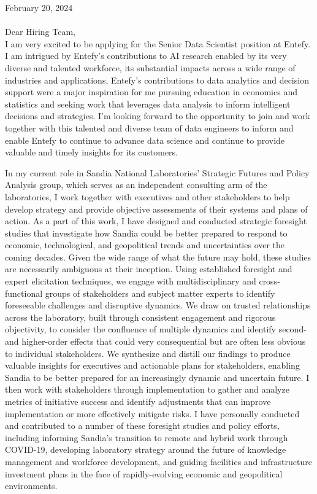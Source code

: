\documentclass[10pt]{article}
\begin{document}
	

\noindent February 20, 2024\\\\
\noindent Dear Hiring Team,\\

I am very excited to be applying for the Senior Data Scientist position at Entefy. I am intrigued by Entefy's contributions to AI research enabled by its very diverse and talented workforce, its substantial impacts across a wide range of industries and applications,  Entefy's contributions to data analytics and decision support were a major inspiration for me pursuing education in economics and statistics and seeking work that leverages data analysis to inform intelligent decisions and strategies. I'm looking forward to the opportunity to join and work together with this talented and diverse team of data engineers to inform and enable Entefy to continue to advance data science and continue to provide valuable and timely insights for its customers. 

In my current role in Sandia National Laboratories' Strategic Futures and Policy Analysis group, which serves as an independent consulting arm of the laboratories, I work together with executives and other stakeholders to help develop strategy and provide objective assessments of their systems and plans of action. As a part of this work, I have designed and conducted strategic foresight studies that investigate how Sandia could be better prepared to respond to economic, technological, and geopolitical trends and uncertainties over the coming decades. Given the wide range of what the future may hold, these studies are necessarily ambiguous at their inception. Using established foresight and expert elicitation techniques, we engage with multidisciplinary and cross-functional groups of stakeholders and subject matter experts to identify foreseeable challenges and disruptive dynamics. We draw on trusted relationships across the laboratory, built through consistent engagement and rigorous objectivity, to consider the confluence of multiple dynamics and identify second- and higher-order effects that could very consequential but are often less obvious to individual stakeholders. We synthesize and distill our findings to produce valuable insights for executives and actionable plans for stakeholders, enabling Sandia to be better prepared for an increasingly dynamic and uncertain future. I then work with stakeholders through implementation to gather and analyze metrics of initiative success and identify adjustments that can improve implementation or more effectively mitigate risks. I have personally conducted and contributed to a number of these foresight studies and policy efforts, including informing Sandia's transition to remote and hybrid work through COVID-19, developing laboratory strategy around the future of knowledge management and workforce development, and guiding facilities and infrastructure investment plans in the face of rapidly-evolving economic and geopolitical environments.
\end{document}
